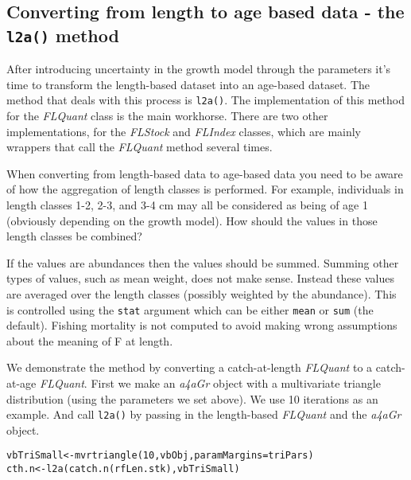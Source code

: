 \documentclass[a4paper,english,10pt]{article}\usepackage[]{graphicx}\usepackage[]{color}
\makeatletter
\newcommand{\hlnum}[1]{\textcolor[rgb]{0.2,0.2,0.2}{#1}}%
\newcommand{\hlstd}[1]{\textcolor[rgb]{0,0,0}{#1}}%
\newcommand{\hlkwb}[1]{\textcolor[rgb]{0.361,0.506,0.596}{#1}}%
\newcommand{\hlkwc}[1]{\textcolor[rgb]{0.361,0.506,0.596}{#1}}%
\newcommand{\hlkwd}[1]{\textcolor[rgb]{0.361,0.506,0.596}{#1}}%
\newenvironment{kframe}{%
 \def\at@end@of@kframe{}%
 \ifinner\ifhmode%
  \def\at@end@of@kframe{\end{minipage}}%
  \begin{minipage}{\columnwidth}%
 \fi\fi%
 \def\FrameCommand##1{\hskip\@totalleftmargin \hskip-\fboxsep
 \colorbox{shadecolor}{##1}\hskip-\fboxsep
     \hskip-\linewidth \hskip-\@totalleftmargin \hskip\columnwidth}%
 \MakeFramed {\advance\hsize-\width
   \@totalleftmargin\z@ \linewidth\hsize
   \@setminipage}}%
 {\par\unskip\endMakeFramed%
 \at@end@of@kframe}
\newenvironment{knitrout}{}{} %
\newcommand{\code}[1]{{\texttt{#1}}}
\newcommand{\class}[1]{{\textit{#1}}}
\makeatother
\begin{document}
\subsection{Converting from length to age based data - the \code{l2a()} method}

After introducing uncertainty in the growth model through the parameters it's time to transform the length-based dataset into an age-based dataset. The method that deals with this process is \code{l2a()}. The implementation of this method for the \class{FLQuant} class is the main workhorse. There are two other implementations, for the \class{FLStock} and \class{FLIndex} classes, which are mainly wrappers that call the \class{FLQuant} method several times.

When converting from length-based data to age-based data you need to be aware of how the aggregation of length classes is performed. For example, individuals in length classes 1-2, 2-3, and 3-4 cm may all be considered as being of age 1 (obviously depending on the growth model). How should the values in those length classes be combined?

If the values are abundances then the values should be summed. Summing other types of values, such as mean weight, does not make sense. Instead these values are averaged over the length classes (possibly weighted by the abundance). This is controlled using the \code{stat} argument which can be either \code{mean} or \code{sum} (the default). Fishing mortality is not computed to avoid making wrong assumptions about the meaning of F at length.

We demonstrate the method by converting a catch-at-length \class{FLQuant} to a catch-at-age \class{FLQuant}. First we make an \class{a4aGr} object with a multivariate triangle distribution (using the parameters we set above). We use 10 iterations as an example. And call \code{l2a()} by passing in the length-based \class{FLQuant} and the \class{a4aGr} object.

\begin{knitrout}
\color{fgcolor}\begin{kframe}
\begin{alltt}
\hlstd{vbTriSmall} \hlkwb{<-} \hlkwd{mvrtriangle}\hlstd{(}\hlnum{10}\hlstd{, vbObj,} \hlkwc{paramMargins}\hlstd{=triPars)}
\hlstd{cth.n} \hlkwb{<-} \hlkwd{l2a}\hlstd{(}\hlkwd{catch.n}\hlstd{(rfLen.stk), vbTriSmall)}
\end{alltt}
\end{kframe}
\end{knitrout}
\end{document}
